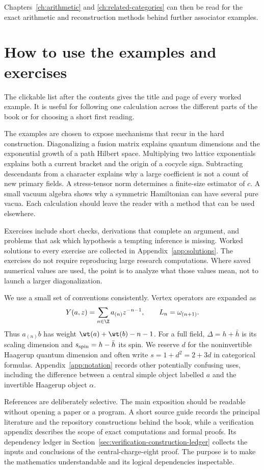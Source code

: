 Chapters~\ref{ch:arithmetic} and \ref{ch:related-categories}
can then be read for the exact arithmetic and reconstruction
methods behind further associator examples.

\section*{How to use the examples and exercises}

The clickable list after the contents gives the title and page of
every worked example. It is useful for following one calculation
across the different parts of the book or for choosing a short
first reading.

The examples are chosen to expose mechanisms that recur in the hard
construction. Diagonalizing a fusion matrix explains quantum
dimensions and the exponential growth of a path Hilbert space.
Multiplying two lattice exponentials explains both a current bracket
and the origin of a cocycle sign. Subtracting descendants from a
character explains why a large coefficient is not a count of new
primary fields. A stress-tensor norm determines a finite-size estimator
of $c$. A small vacuum algebra shows why a symmetric Hamiltonian can
have several pure vacua. Each calculation should leave the reader
with a method that can be used elsewhere.

Exercises include short checks, derivations that complete an argument,
and problems that ask which hypothesis a tempting inference is
missing. Worked solutions to every exercise are collected in
Appendix~\ref{app:solutions}. The exercises
do not require reproducing large research computations. Where saved
numerical values are used, the point is to analyze what those values
mean, not to launch a larger diagonalization.

We use a small set of conventions consistently. Vertex operators are
expanded as
\[
 Y(a,z)=\sum_{n\in\Z}a_{(n)}z^{-n-1},
 \qquad L_n=\omega_{(n+1)}.
\]
Thus $a_{(n)}b$ has weight $\wt(a)+\wt(b)-n-1$.
For a full field, $\Delta=h+\bar h$ is its scaling dimension and
$s_{\rm spin}=h-\bar h$ its spin. We reserve $d$ for the noninvertible
Haagerup quantum dimension and often write $s=1+d^2=2+3d$ in
categorical formulas. Appendix~\ref{app:notation} records other potentially
confusing uses, including the difference between a central simple
object labelled $a$ and the invertible Haagerup object $\alpha$.

References are deliberately selective. The main exposition should be
readable without opening a paper or a program. A short source guide
records the principal literature and the repository constructions
behind the book, while a verification appendix describes the scope
of exact computations and formal proofs. Its dependency ledger in
Section~\ref{sec:verification-construction-ledger} collects the
inputs and conclusions of the central-charge-eight proof.
The purpose is to make the
mathematics understandable and its logical dependencies inspectable.

